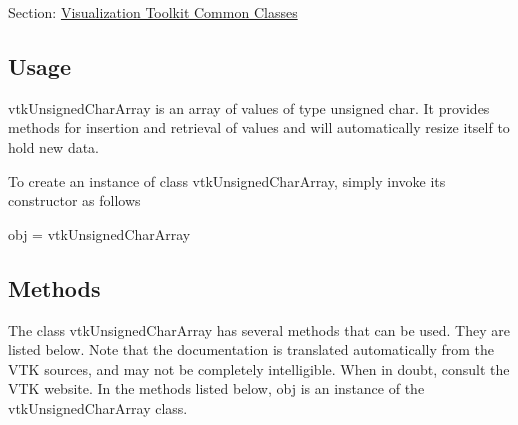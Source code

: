Section\-: \hyperlink{sec_vtkcommon}{Visualization Toolkit Common Classes} \hypertarget{vtkwidgets_vtkxyplotwidget_Usage}{}\subsection{Usage}\label{vtkwidgets_vtkxyplotwidget_Usage}
vtk\-Unsigned\-Char\-Array is an array of values of type unsigned char. It provides methods for insertion and retrieval of values and will automatically resize itself to hold new data.

To create an instance of class vtk\-Unsigned\-Char\-Array, simply invoke its constructor as follows \begin{DoxyVerb}  obj = vtkUnsignedCharArray
\end{DoxyVerb}
 \hypertarget{vtkwidgets_vtkxyplotwidget_Methods}{}\subsection{Methods}\label{vtkwidgets_vtkxyplotwidget_Methods}
The class vtk\-Unsigned\-Char\-Array has several methods that can be used. They are listed below. Note that the documentation is translated automatically from the V\-T\-K sources, and may not be completely intelligible. When in doubt, consult the V\-T\-K website. In the methods listed below, {\ttfamily obj} is an instance of the vtk\-Unsigned\-Char\-Array class. 
